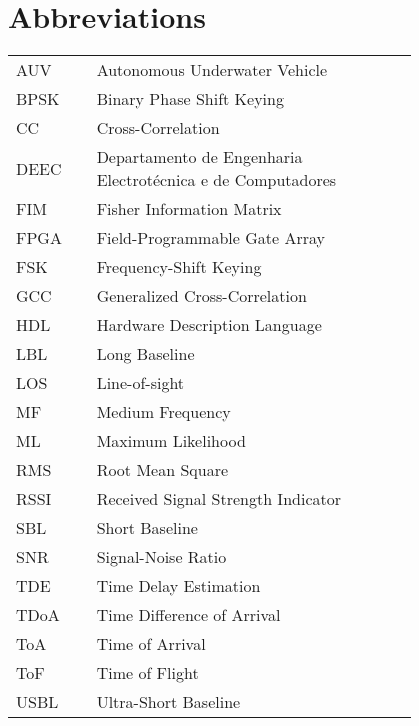 \chapter*{Abbreviations}

\begin{flushleft}
\begin{tabular}{l p{0.8\linewidth}}
AUV		& Autonomous Underwater Vehicle \\
BPSK    & Binary Phase Shift Keying \\
CC 		  & Cross-Correlation \\
DEEC	& Departamento de Engenharia Electrotécnica e de Computadores \\
FIM		  & Fisher Information Matrix \\
FPGA    & Field-Programmable Gate Array \\
FSK		  & Frequency-Shift Keying \\
GCC      & Generalized Cross-Correlation \\
HDL		 & Hardware Description Language\\
LBL		  & Long Baseline\\
LOS		 & Line-of-sight\\
MF		  & Medium Frequency \\
ML		  & Maximum Likelihood \\
RMS		 & Root Mean Square \\
RSSI 	  & Received Signal Strength Indicator \\
SBL		  & Short Baseline \\
SNR		 & Signal-Noise Ratio\\
TDE 	 & Time Delay Estimation \\
TDoA   & Time Difference of Arrival \\
ToA	   	& Time of Arrival \\
ToF		 & Time of Flight \\
USBL    & Ultra-Short Baseline
\end{tabular}
\end{flushleft}